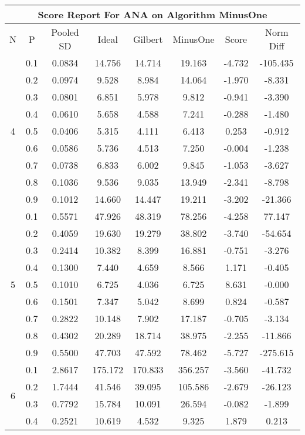 \documentclass[11pt,a4paper]{report}
\begin{document}
\begin{longtable}{ | c | c || c | c | c | c | c | c | }
\hline
\multicolumn{8}{|c|}{ Score Report For ANA on Algorithm MinusOne} \\
\hline
N & P & Pooled SD &  Ideal &  Gilbert & MinusOne  & Score & Norm Diff \\
 \hline
 \hline
 \endhead
\multirow{9}{*}{4} & 0.1 & 0.0834 & 14.756 & 14.714 & 19.163 & -4.732 & -105.435 \\
 & 0.2 & 0.0974 & 9.528 & 8.984 & 14.064 & -1.970 & -8.331 \\
 & 0.3 & 0.0801 & 6.851 & 5.978 & 9.812 & -0.941 & -3.390 \\
 & 0.4 & 0.0610 & 5.658 & 4.588 & 7.241 & -0.288 & -1.480 \\
 & 0.5 & 0.0406 & 5.315 & 4.111 & 6.413 & 0.253 & -0.912 \\
 & 0.6 & 0.0586 & 5.736 & 4.513 & 7.250 & -0.004 & -1.238 \\
 & 0.7 & 0.0738 & 6.833 & 6.002 & 9.845 & -1.053 & -3.627 \\
 & 0.8 & 0.1036 & 9.536 & 9.035 & 13.949 & -2.341 & -8.798 \\
 & 0.9 & 0.1012 & 14.660 & 14.447 & 19.211 & -3.202 & -21.366 \\
 \hline
\multirow{9}{*}{5} & 0.1 & 0.5571 & 47.926 & 48.319 & 78.256 & -4.258 & 77.147 \\
 & 0.2 & 0.4059 & 19.630 & 19.279 & 38.802 & -3.740 & -54.654 \\
 & 0.3 & 0.2414 & 10.382 & 8.399 & 16.881 & -0.751 & -3.276 \\
 & 0.4 & 0.1300 & 7.440 & 4.659 & 8.566 & 1.171 & -0.405 \\
 & 0.5 & 0.1010 & 6.725 & 4.036 & 6.725 & 8.631 & -0.000 \\
 & 0.6 & 0.1501 & 7.347 & 5.042 & 8.699 & 0.824 & -0.587 \\
 & 0.7 & 0.2822 & 10.148 & 7.902 & 17.187 & -0.705 & -3.134 \\
 & 0.8 & 0.4302 & 20.289 & 18.714 & 38.975 & -2.255 & -11.866 \\
 & 0.9 & 0.5500 & 47.703 & 47.592 & 78.462 & -5.727 & -275.615 \\
 \hline
\multirow{9}{*}{6} & 0.1 & 2.8617 & 175.172 & 170.833 & 356.257 & -3.560 & -41.732 \\
 & 0.2 & 1.7444 & 41.546 & 39.095 & 105.586 & -2.679 & -26.123 \\
 & 0.3 & 0.7792 & 15.784 & 10.091 & 26.594 & -0.082 & -1.899 \\
 & 0.4 & 0.2521 & 10.619 & 4.532 & 9.325 & 1.879 & 0.213 \\

\end{longtable}
\end{document}
